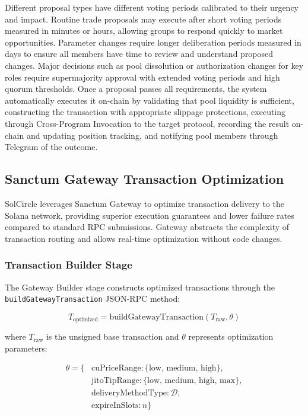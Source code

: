 \documentclass[11pt,a4paper]{article}
\begin{document}
Different proposal types have different voting periods calibrated to their urgency and impact. Routine trade proposals may execute after short voting periods measured in minutes or hours, allowing groups to respond quickly to market opportunities. Parameter changes require longer deliberation periods measured in days to ensure all members have time to review and understand proposed changes. Major decisions such as pool dissolution or authorization changes for key roles require supermajority approval with extended voting periods and high quorum thresholds. Once a proposal passes all requirements, the system automatically executes it on-chain by validating that pool liquidity is sufficient, constructing the transaction with appropriate slippage protections, executing through Cross-Program Invocation to the target protocol, recording the result on-chain and updating position tracking, and notifying pool members through Telegram of the outcome.

\subsection{Sanctum Gateway Transaction Optimization}

SolCircle leverages Sanctum Gateway to optimize transaction delivery to the Solana network, providing superior execution guarantees and lower failure rates compared to standard RPC submissions. Gateway abstracts the complexity of transaction routing and allows real-time optimization without code changes.

\subsubsection{Transaction Builder Stage}

The Gateway Builder stage constructs optimized transactions through the \texttt{buildGatewayTransaction} JSON-RPC method:

\begin{equation}
T_{\text{optimized}} = \text{buildGatewayTransaction}(T_{\text{raw}}, \theta)
\end{equation}

where $T_{\text{raw}}$ is the unsigned base transaction and $\theta$ represents optimization parameters:

\begin{align}
\theta = \{ &\text{cuPriceRange}: \{\text{low, medium, high}\}, \\
&\text{jitoTipRange}: \{\text{low, medium, high, max}\}, \\
&\text{deliveryMethodType}: \mathcal{D}, \\
&\text{expireInSlots}: n \}
\end{align}
\end{document}
